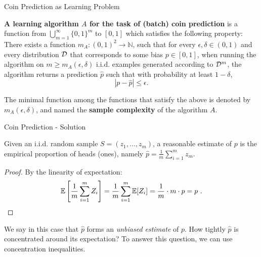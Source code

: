 \documentclass[11pt, usenames, dvipsnames]{beamer}
\begin{document}
\begingroup
\small%
\begin{frame}{Coin Prediction as Learning Problem}
    \begin{definition}
\textbf{A learning algorithm $A$ for the task of (batch) coin prediction} is a function
from $\bigcup_{m=1} ^\infty \{0,1\}^m$ to $[0,1]$ which satisfies the following
property: There exists a function $m_A:
(0,1)^2 \rightarrow \mathbb{N}$, such that for every $\epsilon,\delta
\in (0,1)$ and every distribution $\mathcal{D}$ that corresponds to some
bias $p \in [0,1]$, when running the algorithm on $m \ge m_A(\epsilon,\delta)$
i.i.d. examples generated according to $\mathcal{D}^m$,
the algorithm returns a prediction $\hat{p}$ such that with
probability at least $1-\delta$,
$$
|p-\hat{p}| \le \epsilon.
$$
\end{definition}
\pause
\begin{definition}
The minimal function among the functions that satisfy the above is denoted by $m_A(\epsilon,\delta)$, and named the \textbf{sample complexity} of the algorithm $A$. 
\end{definition}
\end{frame}

\begin{frame}{Coin Prediction - Solution}
    \begin{claim}
    Given an i.i.d. random sample $S=(z_1, \ldots, z_m)$, a reasonable estimate of $p$ is the empirical proportion of heads (ones), namely $\hat{p}=\frac{1}{m} \sum_{i=1} ^m z_m$. 
    \end{claim}
    \pause
    \begin{proof}
    By the linearity of expectation:
    $$
    \mathbb{E} \left [\frac{1}{m} \sum_{i=1} ^m Z_i \right] = \frac{1}{m} \sum_{i=1} ^m
    \mathbb{E}[Z_i] = \frac{1}{m} \cdot m \cdot p = p~.
    $$
    \end{proof}

\pause
We say in this case that $\hat{p}$ forms an \emph{unbiased estimate}
of $p$. How tightly $\hat{p}$ is concentrated around
its expectation? To answer this question, we can use concentration inequalities.

\end{frame}
\endgroup
\end{document}
